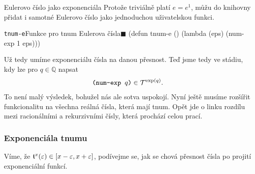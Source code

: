 \begin{myremarkbez}{Eulerovo číslo jako exponenciála}
Protože triviálně platí $e = e^1$, můžu do knihovny přidat i samotné Eulerovo číslo jako jednoduchou uživatelskou funkci.
\begin{lispcode}{\texttt{tnum-e}}{Funkce pro tnum Eulerova čísla\hfill$\blacksquare$}
(\textcolor{funkcionalni}{defun} \textcolor{pojmenovan}{tnum-e} ()
  (\textcolor{funkcionalni}{lambda} (eps)
    (\textcolor{moje}{num-exp} 1 eps)))
\end{lispcode}
\end{myremarkbez}

Už tedy umíme exponenciálu čísla na danou přesnost. Teď jsme tedy ve stádiu, kdy lze pro $q\in\mathbb{Q}$ napsat
\begin{equation}
\texttt{(num-exp } q \texttt{)}\in\mathcal{T}^{\mathrm{exp}(q)}.
\end{equation}
To není malý výsledek, bohužel nás ale sotva uspokojí. Nyní ještě musíme rozšířit funkcionalitu na všechna reálná čísla, která mají tnum. Opět jde o linku rozdílu mezi racionálními a rekurzivními čísly, která prochází celou prací.

\subsubsection{Exponenciála tnumu}
Víme, že $\mathfrak{t}^{x}(\varepsilon) \in [x-\varepsilon,x+\varepsilon]$, podívejme se, jak se chová přesnost čísla po projití exponenciální funkcí.


